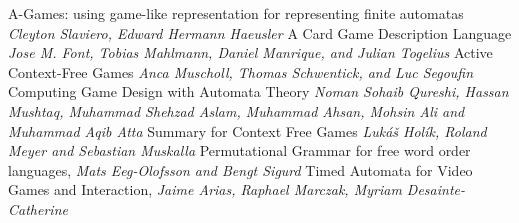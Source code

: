 \documentclass{cours}
\begin{document}
\begin{thebibliography}{5}
     A-Games: using game-like representation for representing finite automatas \textit{Cleyton Slaviero, Edward Hermann Haeusler}
     A Card Game Description Language \textit{Jose M. Font, Tobias Mahlmann, Daniel Manrique, and Julian Togelius}
     Active Context-Free Games \textit{Anca Muscholl, Thomas Schwentick, and Luc Segoufin}
     Computing Game Design with Automata Theory \textit{Noman Sohaib Qureshi, Hassan Mushtaq, Muhammad Shehzad Aslam, Muhammad Ahsan, Mohsin Ali and Muhammad Aqib Atta}
     Summary for Context Free Games \textit{Lukáš Holík, Roland Meyer and Sebastian Muskalla}
     Permutational Grammar for free word order languages, \textit{Mats Eeg-Olofsson and Bengt Sigurd}
     Timed Automata for Video Games and Interaction, \textit{Jaime Arias, Raphael Marczak, Myriam Desainte-Catherine}
\end{thebibliography}
\end{document}
